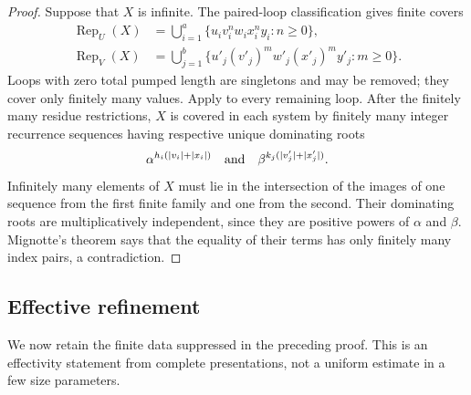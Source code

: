 \begin{proof}
  Suppose that \(X\) is infinite. The paired-loop classification gives
  finite covers
  \[
    \begin{aligned}
      \operatorname{Rep}_U(X)
        &=\bigcup_{i=1}^a
          \{u_i v_i^n w_i x_i^n y_i:n\ge0\},\\
      \operatorname{Rep}_V(X)
        &=\bigcup_{j=1}^b
          \{u'_j(v'_j)^m w'_j(x'_j)^m y'_j:m\ge0\}.
    \end{aligned}
  \]
  Loops with zero total pumped length are singletons and may be removed;
  they cover only finitely many values. Apply
   to every remaining loop.
  After the finitely many residue restrictions, \(X\) is covered in each
  system by finitely many integer recurrence sequences having respective
  unique dominating roots
  \[
    \alpha^{h_i(\lvert v_i \rvert+\lvert x_i \rvert)}
    \quad\hbox{and}\quad
    \beta^{k_j(\lvert v'_j \rvert+\lvert x'_j \rvert)}.
  \]
  Infinitely many elements of \(X\) must lie in the intersection of the
  images of one sequence from the first finite family and one from the
  second. Their dominating roots are multiplicatively independent, since
  they are positive powers of \(\alpha\) and \(\beta\). Mignotte's theorem
  says that the equality of their terms has only finitely many index pairs,
  a contradiction.
\end{proof}

\subsection{Effective refinement}

We now retain the finite data suppressed in the preceding proof. This is an
effectivity statement from complete presentations, not a uniform estimate in
a few size parameters.

